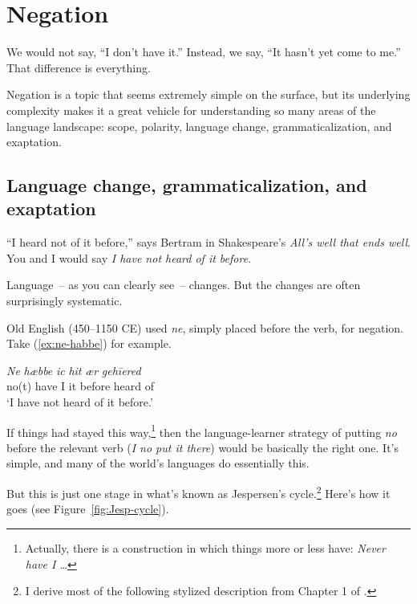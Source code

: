 \chapter{Negation}

\epigraph{We would not say, ``I don't have it.''
Instead, we say, ``It hasn't yet come to me.'' That difference
is everything.}{}

Negation is a topic that seems extremely simple on the surface, but its underlying complexity makes it a great vehicle for understanding so many areas of the language landscape: scope, polarity, language change, grammaticalization, and exaptation.

\section{Language change, grammaticalization, and exaptation}

``I heard not of it before,'' says Bertram in Shakespeare's \textit{All's well that ends well}. You and I would say \textit{I have not heard of it before}.

Language~-- as you can clearly see~-- changes. But the changes are often surprisingly systematic.

Old English (450--1150 CE) used \textit{ne}, simply placed before the verb, for negation. Take (\ref{ex:ne-habbe}) for example.

\ea \label{ex:ne-habbe}
    \gll \textit{Ne} \textit{hæbbe} \textit{ic} \textit{hit} \textit{ær} \textit{gehīered} \\ no(t) have I it before {heard of} \\
    \trans `I have not heard of it before.'
\z

If things had stayed this way,\footnote{Actually, there is a construction in which things more or less have: \textit{Never have I \dots}} then the language-learner strategy of putting \textit{no} before the relevant verb (\textit{I no put it there}) would be basically the right one. It's simple, and many of the world's languages do essentially this.

But this is just one stage in what's known as Jespersen's cycle.\footnote{I derive most of the following stylized description from Chapter 1 of \citet{Jespersen1917}.} Here's how it goes (see Figure~\ref{fig:Jesp-cycle}).

